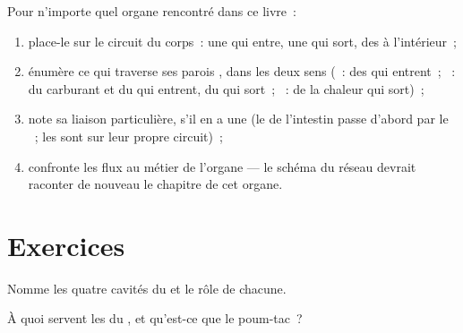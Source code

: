 \begin{method}\label{met:g7:heart-and-circulation:map}
Pour n'importe quel organe rencontré dans ce livre~:
\begin{enumerate}
  \item place-le sur le circuit du corps~: une  qui entre,
        une  qui sort, des  à l'intérieur~;
  \item énumère ce qui traverse ses parois , dans les
        deux sens (~: des  qui entrent~;
        ~: du carburant et du  qui entrent, du
         qui sort~; ~: de la chaleur qui
        sort)~;
  \item note sa liaison particulière, s'il en a une (le  de
        l'intestin passe d'abord par le ~; les  sont sur
        leur propre circuit)~;
  \item confronte les flux au métier de l'organe --- le schéma du
        réseau devrait raconter de nouveau le chapitre de cet
        organe.
\end{enumerate}
\end{method}

\section{Exercices}

\begin{exercise}[$\star$]\label{exo:g7:heart-and-circulation:1}
Nomme les quatre cavités du  et le rôle de chacune.
\end{exercise}

\begin{exercise}[$\star$]\label{exo:g7:heart-and-circulation:2}
À quoi servent les  du , et qu'est-ce que le poum-tac~?
\end{exercise}

